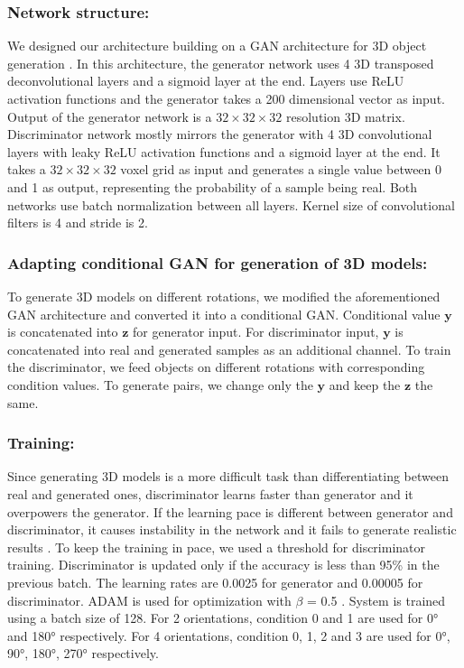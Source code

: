 \documentclass[runningheads]{llncs}
\begin{document}
\subsubsection{Network structure:} We designed our architecture building on a GAN architecture for 3D object generation \cite{smith2017improved}. In this architecture, the generator network uses 4 3D transposed deconvolutional layers and a sigmoid layer at the end. Layers use ReLU activation functions and the generator takes a 200 dimensional vector as input. Output of the generator network is a $32 \times 32 \times 32$ resolution 3D matrix. Discriminator network mostly mirrors the generator with 4 3D convolutional layers with leaky ReLU activation functions and a sigmoid layer at the end. It takes a $32 \times 32 \times 32$ voxel grid as input and generates a single value between 0 and 1 as output, representing the probability of a sample being real. Both networks use batch normalization between all layers. Kernel size of convolutional filters is 4 and stride is 2.

\subsubsection{Adapting conditional GAN for generation of 3D models:} To generate 3D models on different rotations, we modified the aforementioned GAN architecture and converted it into a conditional GAN. Conditional value $\mathbf{y}$  is concatenated into $\mathbf{z}$ for generator input. For discriminator input, $\mathbf{y}$  is concatenated into real and generated samples as an additional channel. To train the discriminator, we feed objects on different rotations with corresponding condition values. To generate pairs, we change only the $\mathbf{y}$  and keep the $\mathbf{z}$ the same. 

\subsubsection{Training:} Since generating 3D models is a more difficult task than differentiating between real and generated ones, discriminator learns faster than generator and it overpowers the generator. If the learning pace is different between generator and discriminator, it causes instability in the network and it fails to generate realistic results \cite{goodfellow2014generative}. To keep the training in pace, we used a threshold for discriminator training. Discriminator is updated only if the accuracy is less than 95\% in the previous batch. The learning rates are 0.0025 for generator and 0.00005 for discriminator. ADAM \cite{kingma2015adam} is used for optimization with $\beta$ = 0.5 . System is trained using a batch size of 128. For 2 orientations, condition 0 and 1 are used for \ang{0} and \ang{180} respectively. For 4 orientations, condition 0, 1, 2 and 3 are used for \ang{0}, \ang{90}, \ang{180}, \ang{270} respectively.
\end{document}
